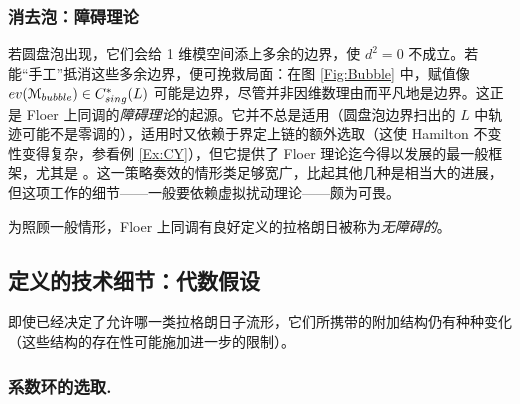 \subsubsection{消去泡：障碍理论} 若圆盘泡出现，它们会给 1 维模空间添上多余的边界，使 $d^2=0$ 不成立。若能“手工”抵消这些多余边界，便可挽救局面：在图 \ref{Fig:Bubble} 中，赋值像 $ev(\EuScript{M}_{bubble}) \in C^*_{sing}(L)$ 可能是边界，尽管并非因维数理由而平凡地是边界。这正是 Floer 上同调的\emph{障碍理论}的起源。它并不总是适用（圆盘泡边界扫出的 $L$ 中轨迹可能不是零调的），适用时又依赖于界定上链的额外选取（这使 Hamilton 不变性变得复杂，参看例 \ref{Ex:CY}），但它提供了 Floer 理论迄今得以发展的最一般框架，尤其是 \cite{FO3, FO3:technical}。这一策略奏效的情形类足够宽广，比起其他几种是相当大的进展，但这项工作的细节——一般要依赖虚拟扰动理论——颇为可畏。

为照顾一般情形，Floer 上同调有良好定义的拉格朗日被称为\emph{无障碍的}。

\subsection{定义的技术细节：代数假设\label{Sec:AlgebraicHyp}} 即使已经决定了允许哪一类拉格朗日子流形，它们所携带的附加结构仍有种种变化（这些结构的存在性可能施加进一步的限制）。

\subsubsection{系数环的选取.\label{Sec:Novikov}}

